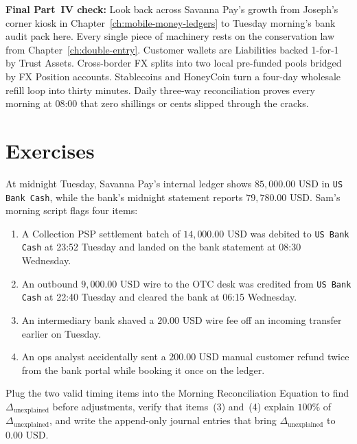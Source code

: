 \begin{walkbox}
\textbf{Final Part~IV check:} Look back across Savanna Pay's growth from Joseph's corner kiosk in Chapter~\ref{ch:mobile-money-ledgers} to Tuesday morning's bank audit pack here. Every single piece of machinery rests on the conservation law from Chapter~\ref{ch:double-entry}. Customer wallets are Liabilities backed 1-for-1 by Trust Assets. Cross-border FX splits into two local pre-funded pools bridged by FX Position accounts. Stablecoins and HoneyCoin turn a four-day wholesale refill loop into thirty minutes. Daily three-way reconciliation proves every morning at 08:00 that zero shillings or cents slipped through the cracks.
\end{walkbox}

\section*{Exercises}

\begin{exercise}
At midnight Tuesday, Savanna Pay's internal ledger shows $85{,}000.00\text{ USD}$ in \texttt{US Bank Cash}, while the bank's midnight statement reports $79{,}780.00\text{ USD}$. Sam's morning script flags four items:
\begin{enumerate}
  \item A Collection PSP settlement batch of $14{,}000.00\text{ USD}$ was debited to \texttt{US Bank Cash} at 23:52 Tuesday and landed on the bank statement at 08:30 Wednesday.
  \item An outbound $9{,}000.00\text{ USD}$ wire to the OTC desk was credited from \texttt{US Bank Cash} at 22:40 Tuesday and cleared the bank at 06:15 Wednesday.
  \item An intermediary bank shaved a $20.00\text{ USD}$ wire fee off an incoming transfer earlier on Tuesday.
  \item An ops analyst accidentally sent a $200.00\text{ USD}$ manual customer refund twice from the bank portal while booking it once on the ledger.
\end{enumerate}
Plug the two valid timing items into the Morning Reconciliation Equation to find $\Delta_{\text{unexplained}}$ before adjustments, verify that items~(3) and~(4) explain $100\%$ of $\Delta_{\text{unexplained}}$, and write the append-only journal entries that bring $\Delta_{\text{unexplained}}$ to $0.00\text{ USD}$.
\end{exercise}

